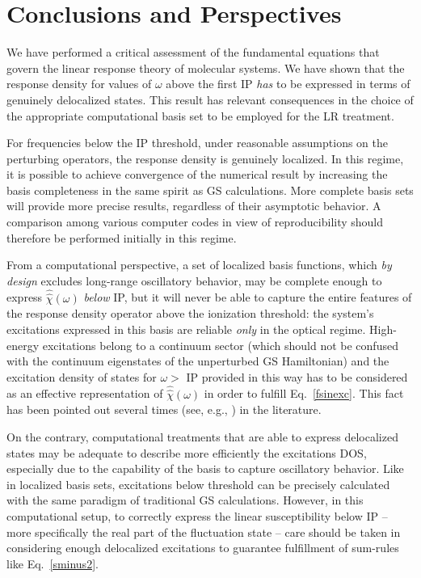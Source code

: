 \documentclass[reprint,aps,prb]{revtex4-1}
\newcommand{\op}[1]{\hat {#1}}
\newcommand{\sop}[1]{\op{\op {#1}}}
\begin{document}
\section{Conclusions and Perspectives}

We have performed a critical assessment of the fundamental equations that govern the linear response theory of molecular systems.
We have shown that the response density for values of $\omega$ above the first IP \emph{has} to be expressed in terms of genuinely delocalized states.
This result has relevant consequences in the choice of the  appropriate computational basis set to be employed for the LR treatment.

For frequencies below the IP threshold, under reasonable assumptions on the perturbing operators, the response density is genuinely localized.
In this regime, it is possible to achieve convergence of the numerical result by increasing the basis completeness in the same spirit as GS calculations.
More complete basis sets will provide more precise results, regardless of their asymptotic behavior. A comparison among various computer codes in view of reproducibility should therefore be performed initially in this regime.

From a computational perspective, a set of localized basis functions, which \emph{by design} excludes long-range oscillatory behavior, may be complete
enough to express $\sop \chi(\omega)$ \emph{below} IP, but it will never be able to capture the entire features of the response density operator above
the ionization threshold: the system's excitations expressed in this basis are reliable \emph{only} in the optical regime.
High-energy excitations belong to a continuum sector (which should not be confused with the continuum eigenstates of the unperturbed GS Hamiltonian)
and the excitation density of states for $\omega >$ IP provided in this way has to be considered as an effective representation of $\sop \chi(\omega)$ in order to fulfill Eq.~\eqref{fsinexc}. This fact has been pointed out several times (see, e.g., \cite{giustino2012,giustino2014}) in the literature.

On the contrary, computational treatments that are able to express delocalized states may be adequate to describe more efficiently the excitations DOS,
especially due to the capability of the basis to capture oscillatory behavior. Like in localized basis sets, excitations below threshold can be
precisely calculated with the same paradigm of traditional GS calculations. However, in this computational setup, to correctly express the linear susceptibility below IP -- more specifically the real part of the fluctuation state -- care should be taken in considering enough delocalized excitations
to guarantee fulfillment of sum-rules like Eq.~\eqref{sminus2}.
\end{document}

